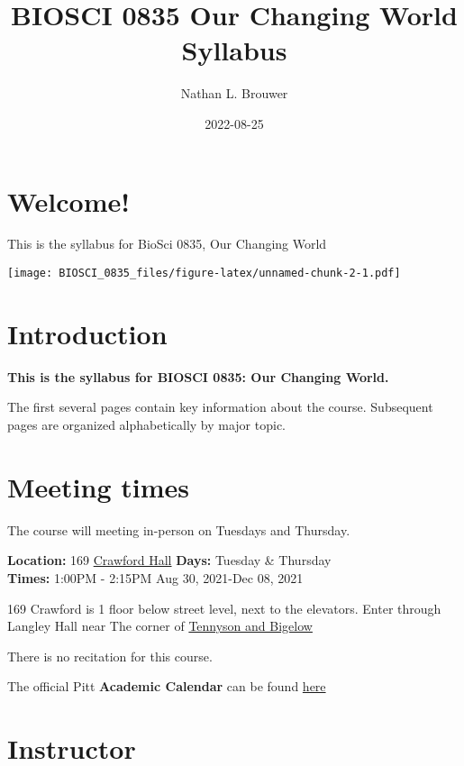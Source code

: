 \documentclass[
]{book}
\title{BIOSCI 0835 Our Changing World Syllabus}
\author{Nathan L. Brouwer}
\date{2022-08-25}
\begin{document}
\maketitle

{
\setcounter{tocdepth}{1}
\tableofcontents
}
\hypertarget{welcome}{%
\chapter{Welcome!}\label{welcome}}

This is the syllabus for BioSci 0835, Our Changing World

\texttt{[image: BIOSCI\_0835\_files/figure-latex/unnamed-chunk-2-1.pdf]}

\hypertarget{intro}{%
\chapter{Introduction}\label{intro}}

\textbf{This is the syllabus for BIOSCI 0835: Our Changing World.}

The first several pages contain key information about the course. Subsequent pages are organized alphabetically by major topic.

\hypertarget{meeting-times}{%
\chapter{Meeting times}\label{meeting-times}}

The course will meeting in-person on Tuesdays and Thursday.

\textbf{Location:} 169 \href{https://calendar.pitt.edu/crawford_hall_909\#.YSZMWdPYq3I}{Crawford Hall}
\textbf{Days:} Tuesday \& Thursday\\
\textbf{Times:} 1:00PM - 2:15PM
Aug 30, 2021-Dec 08, 2021

169 Crawford is 1 floor below street level, next to the elevators. Enter through Langley Hall near The corner of \href{https://goo.gl/maps/ay3KxznH1u4VisWo8}{Tennyson and Bigelow}

There is no recitation for this course.

The official Pitt \textbf{Academic Calendar} can be found \href{https://www.registrar.pitt.edu/sites/default/files/pdf/Academic\%20Calendar\%202022-2023_Apple.pdf}{here}

\hypertarget{nlb}{%
\chapter{Instructor}\label{nlb}}
\end{document}
